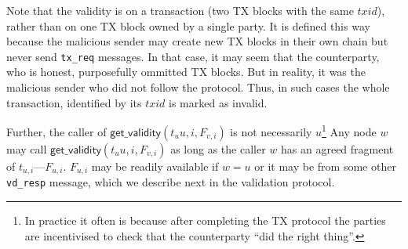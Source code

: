 Note that the validity is on a transaction (two TX blocks with the same $txid$), rather than on one TX block owned by a single party.
It is defined this way because the malicious sender may create new TX blocks in their own chain but never send \texttt{tx\_req} messages.
In that case, it may seem that the counterparty, who is honest, purposefully ommitted TX blocks.
But in reality, it was the malicious sender who did not follow the protocol.
Thus, in such cases the whole transaction, identified by its $txid$ is marked as invalid.

Further, the caller of $\textsf{get\_validity}(t_u{u, i}, F_{v, i})$ is not necessarily 
$u$\footnote{In practice it often is because after completing the TX protocol the parties are incentivised to check that the counterparty ``did the right thing''.}
Any node $w$ may call $\textsf{get\_validity}(t_u{u, i}, F_{v, i})$ as long as the caller $w$ has an agreed fragment of $t_{u, i}$---$F_{u, i}$.
$F_{u, i}$ may be readily available if $w = u$ or it may be from some other \texttt{vd\_resp} message, which we describe next in the validation protocol.

